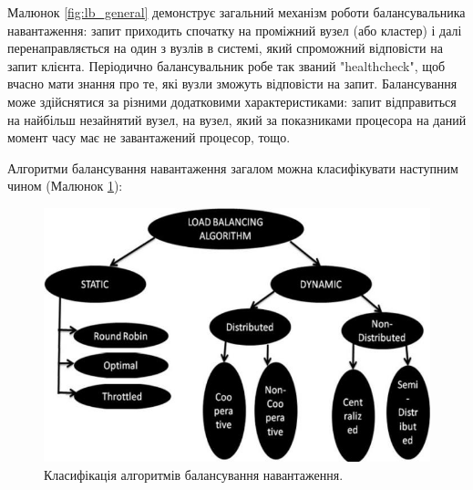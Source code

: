 \documentclass[14pt]{vakthesis}
\begin{document}
Малюнок \ref{fig:lb_general} демонструє загальний механізм роботи  балансувальника навантаження: запит приходить спочатку на проміжний вузел (або кластер) і далі  перенаправляється на один з вузлів в системі, який спроможний відповісти на запит клієнта. Періодично балансувальник робе так званий "healthcheck", щоб вчасно мати знання про те, які вузли зможуть відповісти на запит.
Балансування може здійснятися за різними додатковими характеристиками: запит відправиться на найбільш незайнятий вузел, на вузел, який за показниками процесора на даний момент часу має не завантажений процесор, тощо.

Алгоритми балансування навантаження загалом можна класифікувати наступним чином (Малюнок \ref{fig:lb_classification}):

\begin{figure}
\centering
\includegraphics[width=\linewidth]{images/Classification-of-load-balancing-algorithms-in-cloud.png}
     \caption{Класифікація алгоритмів балансування навантаження.}
     \label{fig:lb_classification}
\end{figure}
\end{document}
